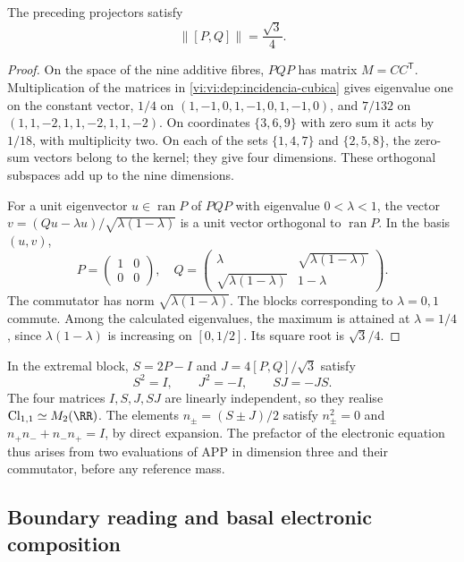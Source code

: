 \begin{proposition}
\label{vi:vi:dep:norma-PQ}
The preceding projectors satisfy
\begin{equation}
 \|[P,Q]\|=\frac{\sqrt3}{4}.
 \label{vi:vi:dep:prefactor-valor}
\end{equation}
\end{proposition}
\begin{proof}
On the space of the nine additive fibres, \(PQP\) has matrix
\(M=CC^{\mathsf T}\). Multiplication of the matrices in
\eqref{vi:vi:dep:incidencia-cubica} gives eigenvalue one on the constant
vector, \(1/4\) on \((1,-1,0,1,-1,0,1,-1,0)\), and
\(7/132\) on \((1,1,-2,1,1,-2,1,1,-2)\).
On coordinates \(\{3,6,9\}\) with zero sum it acts by
\(1/18\), with multiplicity two. On each of the sets
\(\{1,4,7\}\) and \(\{2,5,8\}\), the zero-sum vectors
belong to the kernel; they give four dimensions. These orthogonal
subspaces add up to the nine dimensions.

For a unit eigenvector \(u\in\operatorname{ran}P\) of
\(PQP\) with eigenvalue \(0<\lambda<1\), the vector
\(v=(Qu-\lambda u)/\sqrt{\lambda(1-\lambda)}\) is a unit vector
orthogonal to \(\operatorname{ran}P\). In the basis \((u,v)\),
\[
 P=\begin{pmatrix}1&0\\0&0\end{pmatrix},\quad
 Q=\begin{pmatrix}\lambda&\sqrt{\lambda(1-\lambda)}\\
 \sqrt{\lambda(1-\lambda)}&1-\lambda\end{pmatrix}.
\]
The commutator has norm \(\sqrt{\lambda(1-\lambda)}\).
The blocks corresponding to \(\lambda=0,1\) commute. Among the
calculated eigenvalues, the maximum is attained at \(\lambda=1/4\),
since \(\lambda(1-\lambda)\) is increasing on \([0,1/2]\).
Its square root is \(\sqrt3/4\).
\end{proof}

In the extremal block, \(S=2P-I\) and
\(J=4[P,Q]/\sqrt3\) satisfy
\[
 S^2=I,\qquad J^2=-I,\qquad SJ=-JS.
\]
The four matrices \(I,S,J,SJ\) are linearly independent,
so they realise \(\mathrm{Cl}_{1,1}\simeq M_2(\RR)\).
The elements \(n_\pm=(S\pm J)/2\) satisfy
\(n_\pm^2=0\) and \(n_+n_-+n_-n_+=I\), by direct expansion.
The prefactor of the electronic equation thus arises from two evaluations
of APP in dimension three and their commutator, before any reference
mass.

\subsection{Boundary reading and basal electronic composition}
\label{vi:vi:dep:basal}

